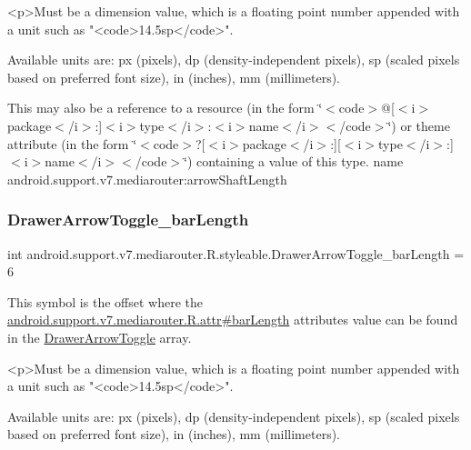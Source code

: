 \begin{DoxyVerb}      <p>Must be a dimension value, which is a floating point number appended with a unit such as "<code>14.5sp</code>".
\end{DoxyVerb}
 Available units are\+: px (pixels), dp (density-\/independent pixels), sp (scaled pixels based on preferred font size), in (inches), mm (millimeters). 

This may also be a reference to a resource (in the form \char`\"{}$<$code$>$@\mbox{[}$<$i$>$package$<$/i$>$\+:\mbox{]}$<$i$>$type$<$/i$>$\+:$<$i$>$name$<$/i$>$$<$/code$>$\char`\"{}) or theme attribute (in the form \char`\"{}$<$code$>$?\mbox{[}$<$i$>$package$<$/i$>$\+:\mbox{]}\mbox{[}$<$i$>$type$<$/i$>$\+:\mbox{]}$<$i$>$name$<$/i$>$$<$/code$>$\char`\"{}) containing a value of this type.  name android.\+support.\+v7.\+mediarouter\+:arrow\+Shaft\+Length \mbox{\label{classandroid_1_1support_1_1v7_1_1mediarouter_1_1R_1_1styleable_a2324cb3e0816358e8359cc591b432f3e}} 
\subsubsection{\texorpdfstring{Drawer\+Arrow\+Toggle\+\_\+bar\+Length}{DrawerArrowToggle\_barLength}}
{\footnotesize\ttfamily int android.\+support.\+v7.\+mediarouter.\+R.\+styleable.\+Drawer\+Arrow\+Toggle\+\_\+bar\+Length = 6\hspace{0.3cm}{\ttfamily [static]}}

This symbol is the offset where the \hyperlink{classandroid_1_1support_1_1v7_1_1mediarouter_1_1R_1_1attr_af3333d2b51e7532bedd93dd5471fdbc4}{android.\+support.\+v7.\+mediarouter.\+R.\+attr\#bar\+Length} attribute\textquotesingle{}s value can be found in the \hyperlink{classandroid_1_1support_1_1v7_1_1mediarouter_1_1R_1_1styleable_a71030bdd9f81aafe32f56767ba04e5b0}{Drawer\+Arrow\+Toggle} array.

\begin{DoxyVerb}      <p>Must be a dimension value, which is a floating point number appended with a unit such as "<code>14.5sp</code>".
\end{DoxyVerb}
 Available units are\+: px (pixels), dp (density-\/independent pixels), sp (scaled pixels based on preferred font size), in (inches), mm (millimeters). 

